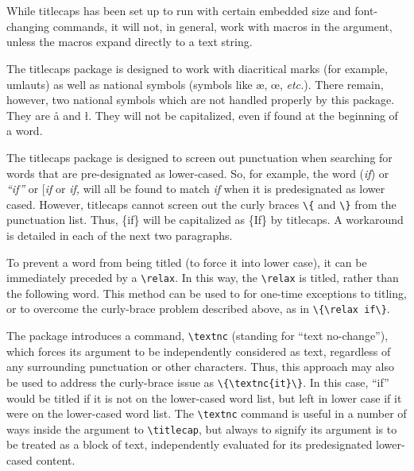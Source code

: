 \documentclass{article}
\def\tcp{\textsf{titlecaps}}
\def\QL{\titlecap{quirks, tricks, and limitations}}
\newcommand\margcmd[1]{\marginpar{\hfill\ttfamily\char'134#1}}
\begin{document}
{\section{\QL}

While {\tcp} has been set up to run with certain embedded size and
font-changing commands, it will not, in general, work with macros in the
argument, unless the macros expand directly to a text string.

The {\tcp} package is designed to work with diacritical marks (for
example, umlauts) as well as national symbols (symbols like \ae, \oe,
\textit{etc.}).  There remain, however, two national symbols which are
not handled properly by this package.  They are {\aa} and {\l}.  They
will not be capitalized, even if found at the beginning of a word.

The {\tcp} package is designed to screen out punctuation when searching
for words that are pre-designated as lower-cased.  So, for example, the
word (\textit{if}) or \textit{``if''} or [\textit{if} or \textit{if,}
will all be found to match \textit{if} when it is predesignated as lower
cased.  However, {\tcp} cannot screen out the curly braces \verb|\{| and
\verb|\}| from the punctuation list.  Thus, \{if\} will be capitalized
as \{If\} by \tcp.  A workaround is detailed in each of the next two
paragraphs.

To prevent a word from being titled (to force it into lower case), it
can be immediately preceded by a \verb|\relax|.  In this way, the
\verb|\relax| is titled, rather than the following word.  This method
can be used to for one-time exceptions to titling, or to overcome the
curly-brace problem described above, as in \verb|\{\relax if\}|.

The package introduces a command, \verb|\textnc|\margcmd{textnc}
(standing for ``text no-change''), which forces its argument to be
independently considered as text, regardless of any surrounding
punctuation or other characters.  Thus, this approach may also be used
to address the curly-brace issue as \verb|\{\textnc{it}\}|.  In this
case, ``if'' would be titled if it is not on the lower-cased word list,
but left in lower case if it were on the lower-cased word list.  The
\verb|\textnc| command is useful in a number of ways inside the argument
to \verb|\titlecap|, but always to signify its argument is to be treated
as a block of text, independently evaluated for its predesignated
lower-cased content.

}
\end{document}
